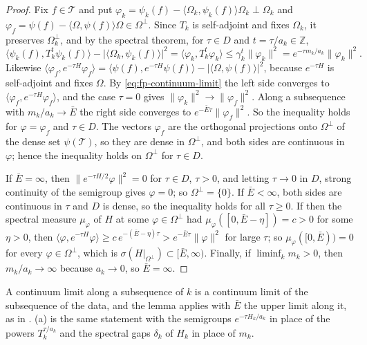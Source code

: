 \documentclass[11pt,a4paper]{amsart}
\theoremstyle{definition}
\theoremstyle{remark}
\numberwithin{equation}{section}
\newcommand{\Z}{\mathbb{Z}}          %
\newcommand{\ip}[2]{\langle #1,#2\rangle}  %
\newcommand{\norm}[1]{\lVert #1\rVert}     %
\newcommand{\abs}[1]{\lvert #1\rvert}      %
\begin{document}
\begin{proof}
Fix $f\in\mathcal T$ and put $\varphi_k=\psi_k(f)-\ip{\Omega_k}{\psi_k(f)}\Omega_k\perp\Omega_k$ and $\varphi_f=\psi(f)-\ip{\Omega}{\psi(f)}\Omega\in\Omega^\perp$. Since $T_k$ is self-adjoint and fixes $\Omega_k$, it preserves $\Omega_k^\perp$, and by the spectral theorem, for $\tau\in D$ and $t=\tau/a_k\in\Z$,
\[
\ip{\psi_k(f)}{T_k^t\psi_k(f)}-\abs{\ip{\Omega_k}{\psi_k(f)}}^2=\ip{\varphi_k}{T_k^t\varphi_k}\le\gamma_k^t\norm{\varphi_k}^2=e^{-\tau m_k/a_k}\norm{\varphi_k}^2 .
\]
Likewise $\ip{\varphi_f}{e^{-\tau H}\varphi_f}=\ip{\psi(f)}{e^{-\tau H}\psi(f)}-\abs{\ip{\Omega}{\psi(f)}}^2$, because $e^{-\tau H}$ is self-adjoint and fixes $\Omega$. By \eqref{eq:fp-continuum-limit} the left side converges to $\ip{\varphi_f}{e^{-\tau H}\varphi_f}$, and the case $\tau=0$ gives $\norm{\varphi_k}^2\to\norm{\varphi_f}^2$. Along a subsequence with $m_k/a_k\to\bar E$ the right side converges to $e^{-\bar E\tau}\norm{\varphi_f}^2$. So the inequality holds for $\varphi=\varphi_f$ and $\tau\in D$. The vectors $\varphi_f$ are the orthogonal projections onto $\Omega^\perp$ of the dense set $\psi(\mathcal T)$, so they are dense in $\Omega^\perp$, and both sides are continuous in $\varphi$; hence the inequality holds on $\Omega^\perp$ for $\tau\in D$.

If $\bar E=\infty$, then $\norm{e^{-\tau H/2}\varphi}^2=0$ for $\tau\in D$, $\tau>0$, and letting $\tau\to0$ in $D$, strong continuity of the semigroup gives $\varphi=0$; so $\Omega^\perp=\{0\}$. If $\bar E<\infty$, both sides are continuous in $\tau$ and $D$ is dense, so the inequality holds for all $\tau\ge0$. If then the spectral measure $\mu_\varphi$ of $H$ at some $\varphi\in\Omega^\perp$ had $\mu_\varphi([0,\bar E-\eta])=c>0$ for some $\eta>0$, then $\ip{\varphi}{e^{-\tau H}\varphi}\ge c\,e^{-(\bar E-\eta)\tau}>e^{-\bar E\tau}\norm\varphi^2$ for large $\tau$; so $\mu_\varphi([0,\bar E))=0$ for every $\varphi\in\Omega^\perp$, which is $\sigma(H|_{\Omega^\perp})\subset[\bar E,\infty)$. Finally, if $\liminf_km_k>0$, then $m_k/a_k\to\infty$ because $a_k\to0$, so $\bar E=\infty$.
\end{proof}

A continuum limit along a subsequence of $k$ is a continuum limit of the subsequence of the data, and the lemma applies with $\bar E$ the upper limit along it, as in \cite{bhattacharjee2026first}. (a) is the same statement with the semigroups $e^{-\tau H_k/a_k}$ in place of the powers $T_k^{\tau/a_k}$ and the spectral gaps $\delta_k$ of $H_k$ in place of $m_k$.
\end{document}
